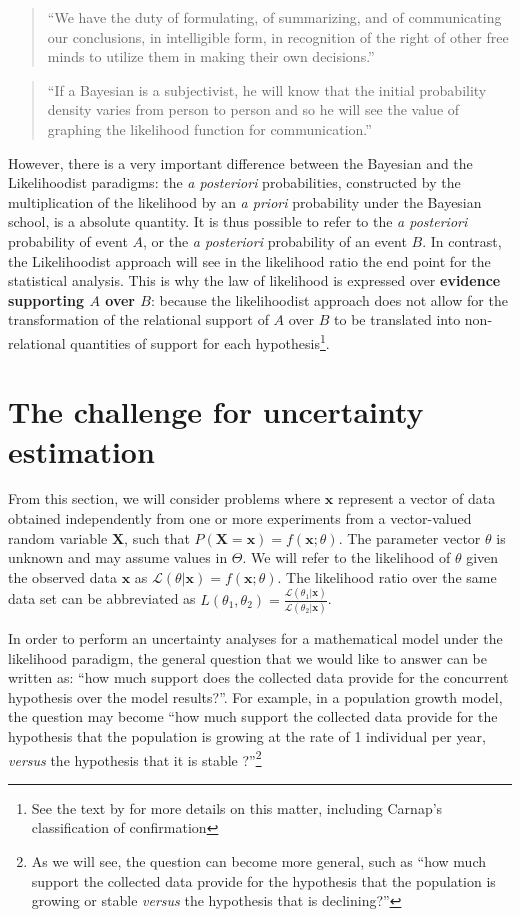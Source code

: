 \documentclass[twoside,12pt,a4paper]{article}
\newcommand{\bu}[1]{\mbox{$\mathbf{#1}$}}
\begin{document}
\begin{quote}
``We have the duty of formulating, of summarizing, and of communicating our conclusions, in intelligible form, in
recognition of the right of other free minds to utilize them in making their own decisions.'' 
\citep{Fisher1955}
\end{quote}

\begin{quote}
``If a Bayesian is a subjectivist, he will know that the initial probability density varies from person to person and
so he will see the value of graphing the likelihood function for communication.'' \citep{Good76}
\end{quote}

However, there is a very important difference between the Bayesian and the Likelihoodist paradigms:
the {\em a posteriori} probabilities, constructed by the multiplication of the likelihood by an {\em a priori}
probability under the Bayesian school, is a absolute quantity. It is thus possible to refer to the {\em
a posteriori} probability of event $A$, or the {\em a posteriori} probability of an event $B$. In contrast,
the Likelihoodist approach will see in the likelihood ratio the end point for the statistical analysis. 
This is why the law of likelihood is expressed over {\bf evidence supporting $A$ over $B$}: because the
likelihoodist approach does not allow for the transformation of the relational support of $A$ over $B$ to
be translated into non-relational quantities of support for each hypothesis\footnote{See the text by
\citep{Fitelson07} for more details on this matter, including Carnap's classification of confirmation}.

\section{The challenge for uncertainty estimation}
From this section, we will consider problems where $\bu{x}$ represent a vector of data obtained independently
from one or more experiments from a vector-valued random variable $\bu{X}$, such that $P(\bu{X}\!=\!\bu{x}) = f(\bu{x};\theta)$. The parameter vector $\theta$ is unknown and may assume values in $\Theta$. We will
refer to the likelihood of $\theta$ given the observed data $\bu{x}$ as 
$\mathcal{L} (\theta | \bu{x}) = f(\bu{x}; \theta)$. The likelihood ratio over the same 
data set can be abbreviated as
$L(\theta_1, \theta_2) = \frac{\mathcal{L}(\theta_1|\bu{x})} {\mathcal{L}(\theta_2|\bu{x})}$. 

In order to perform an uncertainty analyses for a mathematical model under the likelihood paradigm, the 
general question that we would like to answer can be written as: ``how much support does the collected data
provide for the concurrent hypothesis over the model results?''. For example, in a population growth model,
the question may become ``how much support the collected data provide for the hypothesis that
the population is growing at the rate of 1 individual per year, {\em versus} the hypothesis that it is stable
?''\footnote{As we will see, the question can become more general, such as ``how much support the collected
data provide for the hypothesis that the population is growing or stable {\em versus} the hypothesis that is
declining?''}
\end{document}
